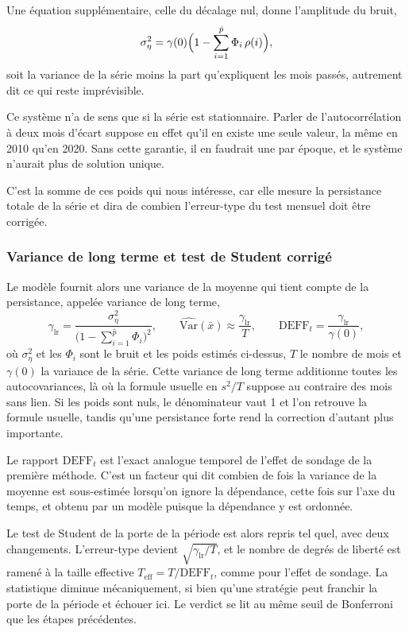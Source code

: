 Une équation supplémentaire, celle du décalage nul, donne l'amplitude du
bruit,
\[
  \sigma^2_\eta = \gamma(0)\Bigl(1 - \sum_{i=1}^{\hat p} \Phi_i\,\rho(i)\Bigr),
\]
soit la variance de la série moins la part qu'expliquent les mois passés,
autrement dit ce qui reste imprévisible.

Ce système n'a de sens que si la série est stationnaire. Parler de
l'autocorrélation à deux mois d'écart suppose en effet qu'il en existe une
seule valeur, la même en 2010 qu'en 2020. Sans cette garantie, il en faudrait
une par époque, et le système n'aurait plus de solution unique.

C'est la somme de ces poids qui nous intéresse, car elle mesure la persistance
totale de la série et dira de combien l'erreur-type du test mensuel doit être
corrigée.

\subsubsection*{Variance de long terme et test de Student corrigé}

Le modèle fournit alors une variance de la moyenne qui tient compte de la
persistance, appelée variance de long terme,
\[
  \gamma_{\mathrm{lr}}
     = \frac{\sigma^2_\eta}{\bigl(1-\sum_{i=1}^{\hat p}\Phi_i\bigr)^{2}},
  \qquad
  \widehat{\mathrm{Var}}(\bar x) \approx \frac{\gamma_{\mathrm{lr}}}{T},
  \qquad
  \mathrm{DEFF}_t = \frac{\gamma_{\mathrm{lr}}}{\gamma(0)},
\]
où \(\sigma^2_\eta\) et les \(\Phi_i\) sont le bruit et les poids estimés
ci-dessus, \(T\) le nombre de mois et \(\gamma(0)\) la variance de la série.
Cette variance de long terme additionne toutes les autocovariances, là où la
formule usuelle en \(s^2/T\) suppose au contraire des mois sans lien. Si les
poids sont nuls, le dénominateur vaut 1 et l'on retrouve la formule usuelle,
tandis qu'une persistance forte rend la correction d'autant plus importante.

Le rapport \(\mathrm{DEFF}_t\) est l'exact analogue temporel de l'effet de
sondage de la première méthode. C'est un facteur qui dit combien de fois la
variance de la moyenne est sous-estimée lorsqu'on ignore la dépendance, cette
fois sur l'axe du temps, et obtenu par un modèle puisque la dépendance y est
ordonnée.

Le test de Student de la porte de la période est alors repris tel quel, avec
deux changements. L'erreur-type devient \(\sqrt{\gamma_{\mathrm{lr}}/T}\), et
le nombre de degrés de liberté est ramené à la taille effective
\(T_{\mathrm{eff}} = T/\mathrm{DEFF}_t\), comme pour l'effet de sondage. La
statistique diminue mécaniquement, si bien qu'une stratégie peut
franchir la porte de la période et échouer ici. Le verdict se lit au même
seuil de Bonferroni que les étapes précédentes.

